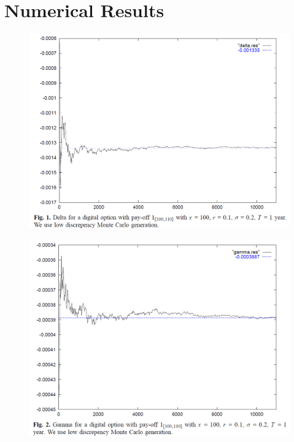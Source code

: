 \documentclass{beamer}
\begin{document}

\section{Numerical Results}
\begin{frame}
  \begin{figure}
  \centering
  \includegraphics[scale=0.3]{fig1_fournie_99_malliavin_mc.png}\\
\end{figure}
\end{frame}

\begin{frame}
  \begin{figure}
  \centering
  \includegraphics[scale=0.3]{fig2_fournie_99_malliavin_mc.png}\\
\end{figure}
\end{frame}
\end{document}

